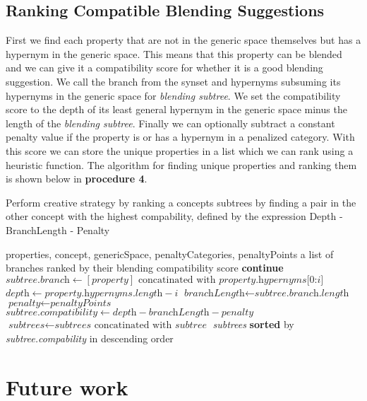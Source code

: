 \subsection{Ranking Compatible Blending Suggestions}
First we find each property that are not in the generic space themselves but has a hypernym in the generic space. This means that this property can be blended and we can give it a compatibility score for whether it is a good blending suggestion. We call the branch from the synset and hypernyms subsuming its hypernyms in the generic space for \emph{blending subtree}. We set the compatibility score to the depth of its least general hypernym in the generic space minus the length of the \emph{blending subtree}. Finally we can optionally subtract a constant penalty value if the property is or has a hypernym in a penalized category. With this score we can store the unique properties in a list which we can rank using a heuristic function. The algorithm for finding unique properties and ranking them is shown below in \textbf{procedure 4}.

\begin{algorithm}
	\caption{Perform creative strategy by ranking a concepts subtrees by finding a pair in the other concept with the highest compability, defined by the expression Depth - BranchLength - Penalty}\label{euclid}
	\begin{algorithmic}[1]
		\Require properties,
		concept,
		genericSpace,
		penaltyCategories,
		penaltyPoints
		\Ensure a list of branches ranked by their blending compatibility score
		\State \textbf{continue}
		\EndIf
		\EndIf
		\State ${\textit{subtree.branch} \gets {[\textit{property}] \text{ concatinated with } \textit{property.hypernyms[0:i]}}}$
		\State ${\textit{depth} \gets {\textit{property.hypernyms.length} - i}}$
		\State ${\textit{branchLength} \gets {\textit{subtree.branch.length}}}$
		\State ${\textit{penalty} \gets \textit{penaltyPoints}}$
		\EndIf
		\State ${\textit{subtree.compatibility} \gets {\textit{depth} - \textit{branchLength} - \textit{penalty}}}$
		\State ${\textit{subtrees} \gets {\textit{subtrees} \text{ concatinated with } \textit{subtree}}}$
		\EndFor
		\EndFor
		\State \Return \textit{subtrees} \textbf{sorted} by \textit{subtree.compability} in descending order
	\EndProcedure
\end{algorithmic}
\end{algorithm}


\section{Future work}